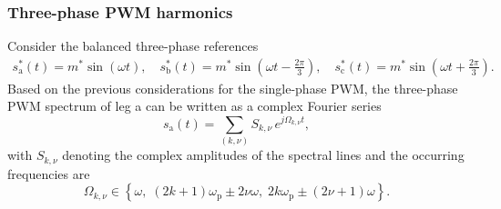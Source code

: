 \begin{frame}
\begin{figure}
    \end{figure}
\end{frame}


\begin{frame}
    \frametitle{Three-phase PWM harmonics}
    Consider the balanced three-phase references
    \begin{align*}
        s_\mathrm{a}^*(t)  = m^* \sin(\omega t), \quad
        s_\mathrm{b}^*(t)  = m^* \sin\!\left(\omega t-\frac{2\pi}{3}\right), \quad
        s_\mathrm{c}^*(t)  = m^* \sin\!\left(\omega t+\frac{2\pi}{3}\right).
    \end{align*}
    Based on the previous considerations for the single-phase PWM, the three-phase PWM spectrum of leg a can be written as a complex Fourier series
    \[
        s_\mathrm{a}(t)=\sum_{(k,\nu)}S_{k,\nu}\,e^{j\Omega_{k,\nu}t},
    \]
    with $S_{k,\nu}$ denoting the complex amplitudes of the spectral lines and the occurring frequencies are
    \[
        \Omega_{k,\nu}\in\left\{
        \omega,\;
        (2k+1)\omega_\mathrm{p}\pm 2\nu\omega,\;
        2k\omega_\mathrm{p}\pm (2\nu+1)\omega
        \right\}.
    \]
\end{frame}

